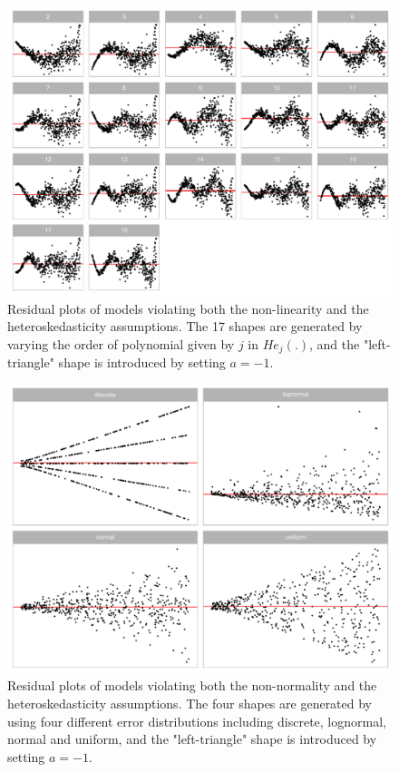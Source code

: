 \documentclass[]{interact}
\theoremstyle{plain}%
\theoremstyle{definition}
\theoremstyle{remark}
\begin{document}
\begin{figure}[!h]

{\centering \includegraphics[width=1\linewidth]{appendix_files/figure-latex/different-j-heter-1} 

}

\caption{Residual plots of models violating both the non-linearity and the heteroskedasticity assumptions. The 17 shapes are generated by varying the order of polynomial given by $j$ in $He_j(.)$, and the "left-triangle" shape is introduced by setting $a = -1$.}\label{fig:different-j-heter}
\end{figure}

\begin{figure}[!h]

{\centering \includegraphics[width=1\linewidth]{appendix_files/figure-latex/different-e-heter-1} 

}

\caption{Residual plots of models violating both the non-normality and the heteroskedasticity assumptions. The four shapes are generated by using four different error distributions including discrete, lognormal, normal and uniform, and the "left-triangle" shape is introduced by setting $a = -1$. }\label{fig:different-e-heter}
\end{figure}
\end{document}
